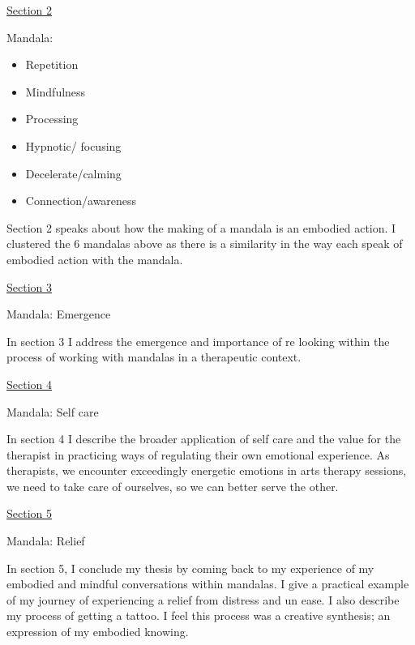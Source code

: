 \underline{Section 2}

Mandala:
\begin{itemize}
\item Repetition
\item Mindfulness
\item Processing 
\item Hypnotic/ focusing 
\item Decelerate/calming
\item Connection/awareness 
\end{itemize}


Section 2 speaks about how the making of a mandala is an embodied action. I clustered the 6 mandalas above as there is a similarity in the way each speak of embodied action with the mandala.

\underline{Section 3}

Mandala:
Emergence

In section 3 I address the emergence and importance of re looking within the process of working with mandalas in a therapeutic context.

\underline{Section 4}

Mandala:
Self care 

In section 4 I describe the broader application of self care and the value for the therapist in practicing ways of regulating their own emotional experience. As therapists, we encounter exceedingly energetic emotions in arts therapy sessions, we need to take care of ourselves, so we can better serve the other.

\underline{Section 5}

Mandala:
Relief

In section 5, I conclude my thesis by coming back to my experience of my embodied and mindful conversations within mandalas. I give a practical example of my journey of experiencing a relief from distress and un ease. I also describe my process of getting a tattoo. I feel this process was a creative synthesis; an expression of my embodied knowing. 

